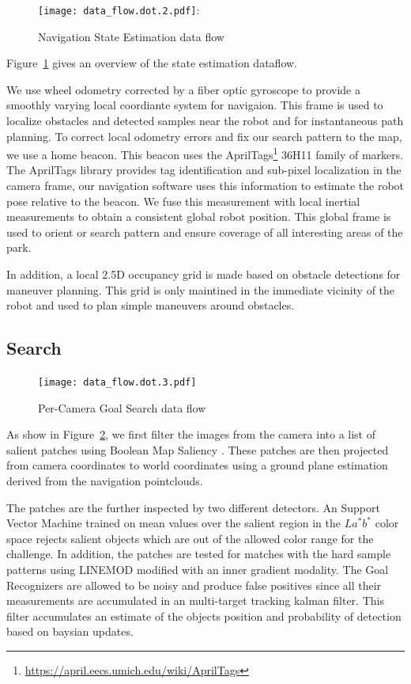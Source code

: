 \documentclass[12pt]{article}
\begin{document}
\begin{figure}[htbp]
\centering
\texttt{[image: data\_flow.dot.2.pdf]}:
\caption{Navigation State Estimation data flow}
\label{fig_se_nav}
\end{figure}
Figure~\ref{fig_se_nav} gives an overview of the state estimation dataflow.

We use wheel odometry corrected by a fiber optic gyroscope to provide a
smoothly varying local coordiante system for navigaion. This frame is used to
localize obstacles and detected samples near the robot and for instantaneous
path planning. To correct local odometry errors and fix our search pattern to
the map, we use a home beacon. This beacon uses the
AprilTags\footnote{\url{https://april.eecs.umich.edu/wiki/AprilTags}} 36H11
family of markers. The AprilTags library provides tag identification and
sub-pixel localization in the camera frame, our navigation software uses this
information to estimate the robot pose relative to the beacon. We fuse this
measurement with local inertial measurements to obtain a consistent global
robot position. This global frame is used to orient or search pattern and
ensure coverage of all interesting areas of the park.

In addition, a local 2.5D occupancy grid is made based on obstacle detections
for maneuver planning. This grid is only maintined in the immediate vicinity of
the robot and used to plan simple maneuvers around obstacles.

\subsection{Search}\label{Search}
\begin{figure}[htbp]
\centering
\texttt{[image: data\_flow.dot.3.pdf]}
\caption{Per-Camera Goal Search data flow}
\label{fig_df_gs}
\end{figure}
As show in Figure~\ref{fig_df_gs}, we first filter the images from the camera
into a list of salient patches using Boolean Map Saliency \cite{ZhangBMS}.
These patches are then projected from camera coordinates to world coordinates
using a ground plane estimation derived from the navigation pointclouds.

The patches are the further inspected by two different detectors. An Support
Vector Machine trained on mean values over the salient region in the $La^*b^*$
color space rejects salient objects which are out of the allowed color range
for the challenge. In addition, the patches are tested for matches with the
hard sample patterns using LINEMOD \cite{HinterLINEMOD} modified with an inner gradient modality. 
The Goal Recognizers are allowed to be noisy and produce false positives since
all their measurements are accumulated in an multi-target tracking kalman
filter. This filter accumulates an estimate of the objects position and
probability of detection based on baysian updates.
\end{document}
